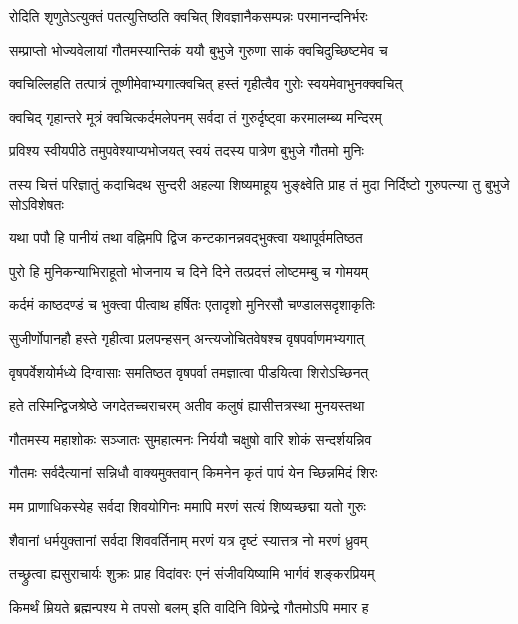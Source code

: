 \twolineshloka
{रोदिति शृणुतेऽत्युक्तं पतत्युत्तिष्ठति क्वचित्}
{शिवज्ञानैकसम्पन्नः परमानन्दनिर्भरः}%

\twolineshloka
{सम्प्राप्तो भोज्यवेलायां गौतमस्यान्तिकं ययौ}
{बुभुजे गुरुणा साकं क्वचिदुच्छिष्टमेव च}%

\twolineshloka
{क्वचिल्लिहति तत्पात्रं तूष्णीमेवाभ्यगात्क्वचित्}
{हस्तं गृहीत्वैव गुरोः स्वयमेवाभुनक्क्वचित्}%

\twolineshloka
{क्वचिद् गृहान्तरे मूत्रं क्वचित्कर्दमलेपनम्}
{सर्वदा तं गुरुर्दृष्ट्वा करमालम्ब्य मन्दिरम्}%

\twolineshloka
{प्रविश्य स्वीयपीठे तमुपवेश्याप्यभोजयत्}
{स्वयं तदस्य पात्रेण बुभुजे गौतमो मुनिः}%

\threelineshloka
{तस्य चित्तं परिज्ञातुं कदाचिदथ सुन्दरी}
{अहल्या शिष्यमाहूय भुङ्क्ष्वेति प्राह तं मुदा}
{निर्दिष्टो गुरुपत्न्या तु बुभुजे सोऽविशेषतः}%

\twolineshloka
{यथा पपौ हि पानीयं तथा वह्निमपि द्विज}
{कन्टकानन्नवद्भुक्त्वा यथापूर्वमतिष्ठत}%

\twolineshloka
{पुरो हि मुनिकन्याभिराहूतो भोजनाय च}
{दिने दिने तत्प्रदत्तं लोष्टमम्बु च गोमयम्}%

\twolineshloka
{कर्दमं काष्ठदण्डं च भुक्त्वा पीत्वाथ हर्षितः}
{एतादृशो मुनिरसौ चण्डालसदृशाकृतिः}%

\twolineshloka
{सुजीर्णोपानहौ हस्ते गृहीत्वा प्रलपन्हसन्}
{अन्त्यजोचितवेषश्च वृषपर्वाणमभ्यगात्}%

\twolineshloka
{वृषपर्वेशयोर्मध्ये दिग्वासाः समतिष्ठत}
{वृषपर्वा तमज्ञात्वा पीडयित्वा शिरोऽच्छिनत्}%

\twolineshloka
{हते तस्मिन्द्विजश्रेष्ठे जगदेतच्चराचरम्}
{अतीव कलुषं ह्यासीत्तत्रस्था मुनयस्तथा}%

\twolineshloka
{गौतमस्य महाशोकः सञ्जातः सुमहात्मनः}
{निर्ययौ चक्षुषो वारि शोकं सन्दर्शयन्निव}%

\twolineshloka
{गौतमः सर्वदैत्यानां सन्निधौ वाक्यमुक्तवान्}
{किमनेन कृतं पापं येन च्छिन्नमिदं शिरः}%

\twolineshloka
{मम प्राणाधिकस्येह सर्वदा शिवयोगिनः}
{ममापि मरणं सत्यं शिष्यच्छद्मा यतो गुरुः}%

\twolineshloka
{शैवानां धर्मयुक्तानां सर्वदा शिववर्तिनाम्}
{मरणं यत्र दृष्टं स्यात्तत्र नो मरणं ध्रुवम्}%

\twolineshloka
{तच्छ्रुत्वा ह्यसुराचार्यः शुक्रः प्राह विदांवरः}
{एनं संजीवयिष्यामि भार्गवं शङ्करप्रियम्}%

\twolineshloka
{किमर्थं म्रियते ब्रह्मन्पश्य मे तपसो बलम्}
{इति वादिनि विप्रेन्द्रे गौतमोऽपि ममार ह}%

